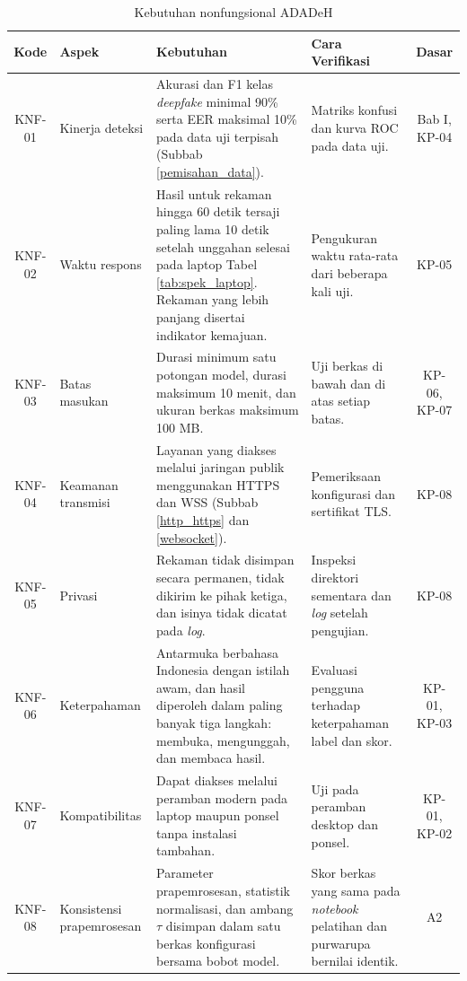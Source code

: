 \begin{table}[t]
  \centering
  \small
  \caption{Kebutuhan nonfungsional ADADeH}
  \label{tab:knf}
  \renewcommand{\arraystretch}{1.25}
  \begin{tabularx}{\textwidth}{| c | p{2.1cm} | X | X | c |}
    \hline
    \textbf{Kode} & \textbf{Aspek} & \textbf{Kebutuhan} & \textbf{Cara Verifikasi} & \textbf{Dasar} \\
    \hline
    KNF-01 & Kinerja deteksi & Akurasi dan F1 kelas \textit{deepfake} minimal 90\% serta EER maksimal 10\% pada data uji terpisah (Subbab \ref{pemisahan_data}). & Matriks konfusi dan kurva ROC pada data uji. & Bab I, KP-04 \\
    KNF-02 & Waktu respons & Hasil untuk rekaman hingga 60 detik tersaji paling lama 10 detik setelah unggahan selesai pada laptop Tabel \ref{tab:spek_laptop}. Rekaman yang lebih panjang disertai indikator kemajuan. & Pengukuran waktu rata-rata dari beberapa kali uji. & KP-05 \\
    KNF-03 & Batas masukan & Durasi minimum satu potongan model, durasi maksimum 10 menit, dan ukuran berkas maksimum 100 MB. & Uji berkas di bawah dan di atas setiap batas. & KP-06, KP-07 \\
    KNF-04 & Keamanan transmisi & Layanan yang diakses melalui jaringan publik menggunakan HTTPS dan WSS (Subbab \ref{http_https} dan \ref{websocket}). & Pemeriksaan konfigurasi dan sertifikat TLS. & KP-08 \\
    KNF-05 & Privasi & Rekaman tidak disimpan secara permanen, tidak dikirim ke pihak ketiga, dan isinya tidak dicatat pada \textit{log}. & Inspeksi direktori sementara dan \textit{log} setelah pengujian. & KP-08 \\
    KNF-06 & Keterpahaman & Antarmuka berbahasa Indonesia dengan istilah awam, dan hasil diperoleh dalam paling banyak tiga langkah: membuka, mengunggah, dan membaca hasil. & Evaluasi pengguna terhadap keterpahaman label dan skor. & KP-01, KP-03 \\
    KNF-07 & Kompatibilitas & Dapat diakses melalui peramban modern pada laptop maupun ponsel tanpa instalasi tambahan. & Uji pada peramban desktop dan ponsel. & KP-01, KP-02 \\
    KNF-08 & Konsistensi prapemrosesan & Parameter prapemrosesan, statistik normalisasi, dan ambang $\tau$ disimpan dalam satu berkas konfigurasi bersama bobot model. & Skor berkas yang sama pada \textit{notebook} pelatihan dan purwarupa bernilai identik. & A2 \\
    \hline
  \end{tabularx}
\end{table}

